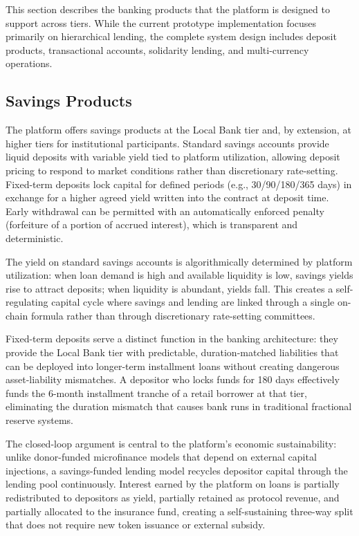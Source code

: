 \documentclass[12pt,a4paper]{report}
\begin{document}
This section describes the banking products that the platform is designed to support across tiers. While the current prototype implementation focuses primarily on hierarchical lending, the complete system design includes deposit products, transactional accounts, solidarity lending, and multi-currency operations.

\subsection{Savings Products}

The platform offers savings products at the Local Bank tier and, by extension, at higher tiers for institutional participants. Standard savings accounts provide liquid deposits with variable yield tied to platform utilization, allowing deposit pricing to respond to market conditions rather than discretionary rate-setting. Fixed-term deposits lock capital for defined periods (e.g., 30/90/180/365 days) in exchange for a higher agreed yield written into the contract at deposit time. Early withdrawal can be permitted with an automatically enforced penalty (forfeiture of a portion of accrued interest), which is transparent and deterministic.

The yield on standard savings accounts is algorithmically determined by platform utilization: when loan demand is high and available liquidity is low, savings yields rise to attract deposits; when liquidity is abundant, yields fall. This creates a self-regulating capital cycle where savings and lending are linked through a single on-chain formula rather than through discretionary rate-setting committees.

Fixed-term deposits serve a distinct function in the banking architecture: they provide the Local Bank tier with predictable, duration-matched liabilities that can be deployed into longer-term installment loans without creating dangerous asset-liability mismatches. A depositor who locks funds for 180 days effectively funds the 6-month installment tranche of a retail borrower at that tier, eliminating the duration mismatch that causes bank runs in traditional fractional reserve systems.

The closed-loop argument is central to the platform's economic sustainability: unlike donor-funded microfinance models that depend on external capital injections, a savings-funded lending model recycles depositor capital through the lending pool continuously. Interest earned by the platform on loans is partially redistributed to depositors as yield, partially retained as protocol revenue, and partially allocated to the insurance fund, creating a self-sustaining three-way split that does not require new token issuance or external subsidy.
\end{document}
